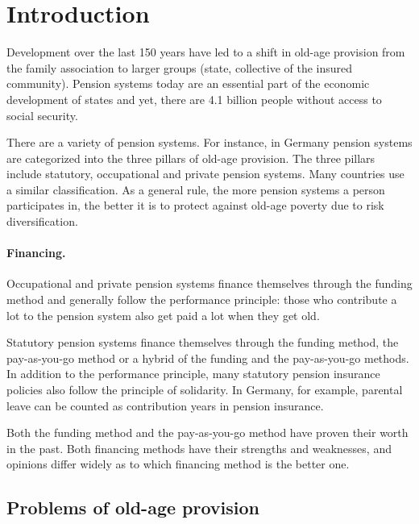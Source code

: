 \section{Introduction}

Development over the last 150 years have led to a shift in old-age provision from the family association to larger groups (state, collective of the insured community). Pension systems today are an essential part of the economic development of states and yet, there are 4.1 billion people without access to social security.\cite{noauthor_universal_2017}

There are a variety of pension systems. For instance, in Germany pension systems are categorized into the three pillars of old-age provision. The three pillars include statutory, occupational and private pension systems. Many countries use a similar classification. As a general rule, the more pension systems a person participates in, the better it is to protect against old-age poverty due to risk diversification.

\paragraph{Financing.} Occupational and private pension systems finance themselves through the funding method and generally follow the performance principle: those who contribute a lot to the pension system also get paid a lot when they get old.

Statutory pension systems finance themselves through the funding method, the pay-as-you-go method or a hybrid of the funding and the pay-as-you-go methods. In addition to the performance principle, many statutory pension insurance policies also follow the principle of solidarity. In Germany, for example, parental leave can be counted as contribution years in pension insurance.

Both the funding method and the pay-as-you-go method have proven their worth in the past. Both financing methods have their strengths and weaknesses, and opinions differ widely as to which financing method is the better one.


\subsection{Problems of old-age provision}

